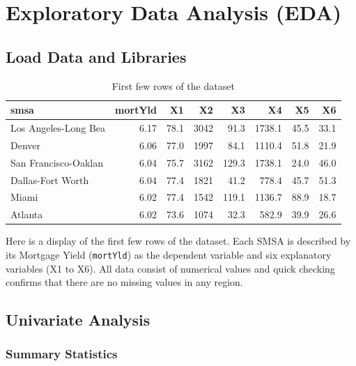 \documentclass[
  11pt,
]{article}
\begin{document}
\section{Exploratory Data Analysis
(EDA)}\label{exploratory-data-analysis-eda}

\subsection{Load Data and Libraries}\label{load-data-and-libraries}

\begingroup\fontsize{8}{10}\selectfont

\begin{longtable}[t]{lrrrrrrr}
\caption{\label{tab:unnamed-chunk-1}First few rows of the dataset}\\
\toprule
smsa & mortYld & X1 & X2 & X3 & X4 & X5 & X6\\
\midrule
Los Angeles-Long Bea & 6.17 & 78.1 & 3042 & 91.3 & 1738.1 & 45.5 & 33.1\\
Denver & 6.06 & 77.0 & 1997 & 84.1 & 1110.4 & 51.8 & 21.9\\
San Francisco-Oaklan & 6.04 & 75.7 & 3162 & 129.3 & 1738.1 & 24.0 & 46.0\\
Dallas-Fort Worth & 6.04 & 77.4 & 1821 & 41.2 & 778.4 & 45.7 & 51.3\\
Miami & 6.02 & 77.4 & 1542 & 119.1 & 1136.7 & 88.9 & 18.7\\
\addlinespace
Atlanta & 6.02 & 73.6 & 1074 & 32.3 & 582.9 & 39.9 & 26.6\\
\bottomrule
\end{longtable}
\endgroup{}

Here is a display of the first few rows of the dataset. Each SMSA is
described by its Mortgage Yield (\texttt{mortYld}) as the dependent
variable and six explanatory variables (X1 to X6). All data consist of
numerical values and quick checking confirms that there are no missing
values in any region.

\subsection{Univariate Analysis}\label{univariate-analysis}

\subsubsection{Summary Statistics}\label{summary-statistics}

\begingroup\fontsize{8}{10}\selectfont
\end{document}
